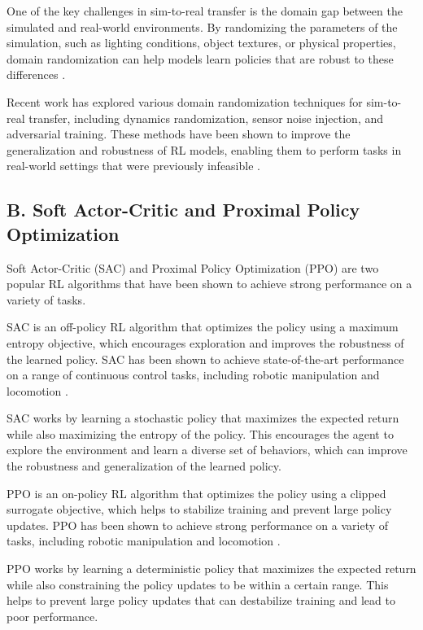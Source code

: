\documentclass[12pt]{article}
\begin{document}
One of the key challenges in sim-to-real transfer is the domain gap between the simulated and real-world environments. By randomizing the parameters of the simulation, such as lighting conditions, object textures, or physical properties, domain randomization can help models learn policies that are robust to these differences \cite{Tobin2017}.

Recent work has explored various domain randomization techniques for sim-to-real transfer, including dynamics randomization, sensor noise injection, and adversarial training. These methods have been shown to improve the generalization and robustness of RL models, enabling them to perform tasks in real-world settings that were previously infeasible \cite{Peng2018}.

\subsection{B. Soft Actor-Critic and Proximal Policy Optimization}

Soft Actor-Critic (SAC) and Proximal Policy Optimization (PPO) are two popular RL algorithms that have been shown to achieve strong performance on a variety of tasks. 

SAC is an off-policy RL algorithm that optimizes the policy using a maximum entropy objective, which encourages exploration and improves the robustness of the learned policy. SAC has been shown to achieve state-of-the-art performance on a range of continuous control tasks, including robotic manipulation and locomotion \cite{Haarnoja2018}.

SAC works by learning a stochastic policy that maximizes the expected return while also maximizing the entropy of the policy. This encourages the agent to explore the environment and learn a diverse set of behaviors, which can improve the robustness and generalization of the learned policy.

PPO is an on-policy RL algorithm that optimizes the policy using a clipped surrogate objective, which helps to stabilize training and prevent large policy updates. PPO has been shown to achieve strong performance on a variety of tasks, including robotic manipulation and locomotion \cite{Schulman2017}.

PPO works by learning a deterministic policy that maximizes the expected return while also constraining the policy updates to be within a certain range. This helps to prevent large policy updates that can destabilize training and lead to poor performance.
\end{document}

